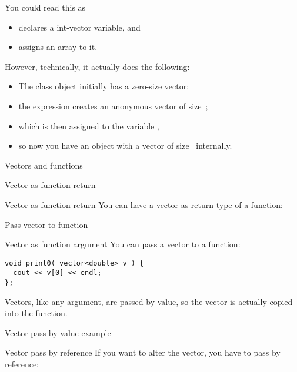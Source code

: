 You could read this as
\begin{itemize}
\item {} declares a int-vector variable, and
\item {} assigns an array to it.
\end{itemize}
However, 
technically, it actually does the following:
\begin{itemize}
\item The class object initially has a zero-size vector;
\item the expression  creates an anonymous vector
  of size~;
\item which is then assigned to the variable ,
\item so now you have an object with a vector of size~ internally.
\end{itemize}

 {Vectors and functions}

 {Vector as function return}

\begin{block}{Vector as function return}
  \label{sl:vector-return}
  You can have a vector as return type of a function:
\end{block}

 {Pass vector to function}

\begin{block}{Vector as function argument}
  \label{sl:vector-arg}
  You can pass a vector to a function:
\begin{verbatim}
void print0( vector<double> v ) {
  cout << v[0] << endl;
};
\end{verbatim}
Vectors, like any argument, are passed by value, so the vector is
actually copied into the function.
\end{block}

\begin{block}{Vector pass by value example}
  \label{sl:vector-arg-ex}
\end{block}

\begin{block}{Vector pass by reference}
  \label{sl:vector-arg-ref}
  If you want to alter the vector, you have to pass by reference:
\end{block}

